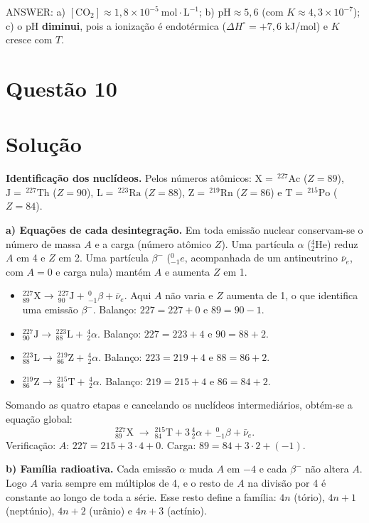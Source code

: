 \documentclass{article}%
\begin{document}
\medskip
\noindent ANSWER: a) $[\mathrm{CO_2}]\approx1{,}8\times10^{-5}\ \text{mol}\cdot\text{L}^{-1}$; b) $\mathrm{pH}\approx5{,}6$ (com $K\approx4{,}3\times10^{-7}$); c) o pH \textbf{diminui}, pois a ionização é endotérmica ($\Delta H^\circ=+7{,}6$ kJ/mol) e $K$ cresce com $T$.%
\newpage%
\section*{Questão 10}

\section*{Solução}

\textbf{Identificação dos nuclídeos.} Pelos números atômicos: $\mathrm{X}=\,^{227}\mathrm{Ac}$ ($Z=89$), $\mathrm{J}=\,^{227}\mathrm{Th}$ ($Z=90$), $\mathrm{L}=\,^{223}\mathrm{Ra}$ ($Z=88$), $\mathrm{Z}=\,^{219}\mathrm{Rn}$ ($Z=86$) e $\mathrm{T}=\,^{215}\mathrm{Po}$ ($Z=84$).

\medskip
\textbf{a) Equações de cada desintegração.}
Em toda emissão nuclear conservam-se o número de massa $A$ e a carga (número atômico $Z$). Uma partícula $\alpha$ ($^{4}_{2}\text{He}$) reduz $A$ em 4 e $Z$ em 2. Uma partícula $\beta^-$ ($^{0}_{-1}e$, acompanhada de um antineutrino $\bar\nu_e$, com $A=0$ e carga nula) mantém $A$ e aumenta $Z$ em 1.

\begin{itemize}
\item $^{227}_{89}\mathrm{X}\to\,^{227}_{90}\mathrm{J}+\,^{0}_{-1}\beta+\bar\nu_e$. Aqui $A$ não varia e $Z$ aumenta de 1, o que identifica uma emissão $\beta^-$. Balanço: $227=227+0$ e $89=90-1$.
\item $^{227}_{90}\mathrm{J}\to\,^{223}_{88}\mathrm{L}+\,^{4}_{2}\alpha$. Balanço: $227=223+4$ e $90=88+2$.
\item $^{223}_{88}\mathrm{L}\to\,^{219}_{86}\mathrm{Z}+\,^{4}_{2}\alpha$. Balanço: $223=219+4$ e $88=86+2$.
\item $^{219}_{86}\mathrm{Z}\to\,^{215}_{84}\mathrm{T}+\,^{4}_{2}\alpha$. Balanço: $219=215+4$ e $86=84+2$.
\end{itemize}

Somando as quatro etapas e cancelando os nuclídeos intermediários, obtém-se a equação global:
\[
^{227}_{89}\mathrm{X}\;\longrightarrow\;^{215}_{84}\mathrm{T}+3\,^{4}_{2}\alpha+\,^{0}_{-1}\beta+\bar\nu_e .
\]
Verificação: $A$: $227=215+3\cdot4+0$. Carga: $89=84+3\cdot2+(-1)$.

\medskip
\textbf{b) Família radioativa.}
Cada emissão $\alpha$ muda $A$ em $-4$ e cada $\beta^-$ não altera $A$. Logo $A$ varia sempre em múltiplos de 4, e o resto de $A$ na divisão por 4 é constante ao longo de toda a série. Esse resto define a família: $4n$ (tório), $4n+1$ (neptúnio), $4n+2$ (urânio) e $4n+3$ (actínio).
\end{document}
